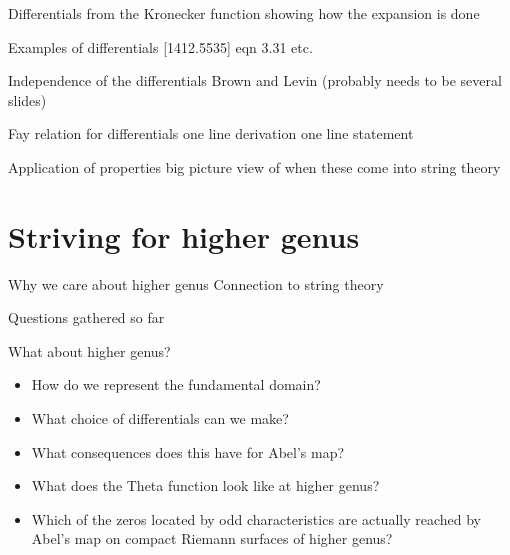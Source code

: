 \documentclass[11pt,aspectratio=169]{beamer}
\begin{document}
\begin{frame}{Differentials from the Kronecker function}
    showing how the expansion is done
\end{frame}

\begin{frame}{Examples of differentials}
    [1412.5535] eqn 3.31 etc.
\end{frame}

\begin{frame}{Independence of the differentials}
    Brown and Levin
    (probably needs to be several slides)
\end{frame}

\begin{frame}{Fay relation for differentials}
    one line derivation
    one line statement
\end{frame}

\begin{frame}{Application of properties}
    big picture view of when these come into string theory
\end{frame}

\section{Striving for higher genus}

\begin{frame}{Why we care about higher genus}
    Connection to string theory
\end{frame}

\begin{frame}{Questions gathered so far}
    {
        \begin{block}{What about higher genus?}
            \begin{itemize}
                \item How do we represent the fundamental domain?
                \item What choice of differentials can we make?
                \item What consequences does this have for Abel's map?
                \item What does the Theta function look like at higher genus?
                \item Which of the zeros located by odd characteristics are actually reached by Abel's map on compact Riemann surfaces of higher genus?
            \end{itemize}
        \end{block}
    }
\end{frame}
\end{document}
